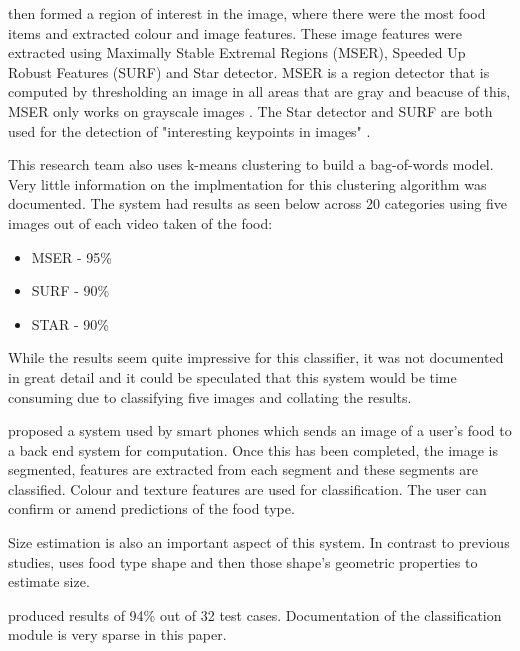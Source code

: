 \parencite{chen2010toward} then formed a region of interest in the image, where there were the most food items and extracted colour and image features.
These image features were extracted using Maximally Stable Extremal Regions (MSER), Speeded Up Robust Features (SURF) and Star detector.
MSER is a region detector that is computed by thresholding an image in all areas that are gray and beacuse of this, MSER only works on grayscale images \parencite{sift}.
The Star detector and SURF are both used for the detection of "interesting keypoints in images" \parencite{chen2010toward}.

This research team also uses k-means clustering to build a bag-of-words model.
Very little information on the implmentation for this clustering algorithm was documented.
The system had results as seen below across 20 categories using five images out of each video taken of the food:
\begin{itemize}
	\item{MSER - 95\%}
	\item{SURF - 90\%}
	\item{STAR - 90\%}
\end{itemize}
While the results seem quite impressive for this classifier, it was not documented in great detail and it could be speculated that this system would be time consuming due to classifying five images and collating the results.




\parencite{schap2014merging} proposed a system used by smart phones which sends an image of a user's food to a back end system for computation.
Once this has been completed, the image is segmented, features are extracted from each segment and these segments are classified.
Colour and texture features are used for classification.
The user can confirm or amend predictions of the food type.

Size estimation is also an important aspect of this system.
In contrast to previous studies, \parencite{snap} uses food type shape and then those shape's geometric properties to estimate size.

\parencite{schap2014merging} produced results of 94\% out of 32 test cases.
Documentation of the classification module is very sparse in this paper.
